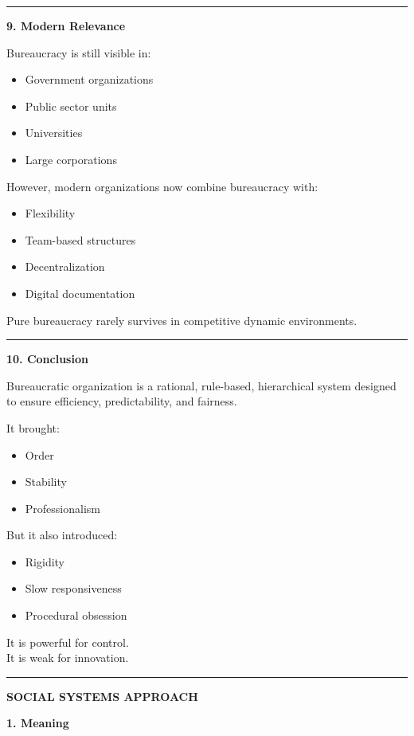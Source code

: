 \documentclass[10pt,a4paper]{article}
\newcommand{\separator}{\vspace{0.4em}\noindent\rule{\linewidth}{0.6pt}\vspace{0.4em}}
\begin{document}
\separator

\textbf{9. Modern Relevance}

Bureaucracy is still visible in:

\begin{itemize}
  \item Government organizations
  \item Public sector units
  \item Universities
  \item Large corporations
\end{itemize}

However, modern organizations now combine bureaucracy with:
\begin{itemize}
  \item Flexibility
  \item Team-based structures
  \item Decentralization
  \item Digital documentation
\end{itemize}

Pure bureaucracy rarely survives in competitive dynamic environments.

\separator

\textbf{10. Conclusion}

Bureaucratic organization is a rational, rule-based, hierarchical system designed to ensure
efficiency, predictability, and fairness.

It brought:
\begin{itemize}
  \item Order
  \item Stability
  \item Professionalism
\end{itemize}

But it also introduced:
\begin{itemize}
  \item Rigidity
  \item Slow responsiveness
  \item Procedural obsession
\end{itemize}

It is powerful for control.\\
It is weak for innovation.

\separator

\begin{center}
  \large\textbf{SOCIAL SYSTEMS APPROACH}
\end{center}

\textbf{1. Meaning}
\end{document}
